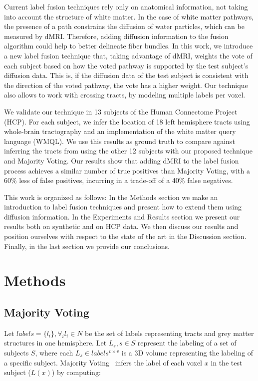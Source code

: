 Current label fusion techniques rely only on anatomical information, not taking 
into account the structure of white matter. In the case of white matter pathways,
the presence of a path constrains the diffusion of water particles, which can be
measured by dMRI. Therefore, adding diffusion information to the fusion algorithm
could help to better delineate fiber bundles. In this work, we introduce a new 
label fusion technique that, taking advantage of dMRI, weights the vote of each
subject based on how the voted pathway is supported by the test subject's diffusion
data. This is, if the diffusion data of the test subject is consistent with the
direction of the voted pathway, the vote has a higher weight. Our technique also
allows to work with crossing tracts, by modeling multiple labels per voxel.

We validate our technique in 13 subjects of the Human Connectome Project (HCP).
For each subject, we infer the location of 18 left hemisphere tracts using
whole-brain tractography and an implementation of the white matter query language
(WMQL). We use this results as ground truth to compare against inferring the
tracts from using the other 12 subjects with our proposed technique and Majority
Voting. Our results show that adding dMRI to the label fusion process achieves a
similar number of true positives than Majority Voting, with a 60\% less of
false positives, incurring in a trade-off of a 40\% false negatives.

This work is organized as follows: In the Methods section we make an introduction
to label fusion techniques and present how to extend them using diffusion
information. In the Experiments and Results section we present our results 
both on synthetic and on HCP data. We then discuss our results and position
ourselves with respect to the state of the art in the Discussion section. 
Finally, in the last section we provide our conclusions.

\section{Methods}
\label{sec:methods}

\subsection{Majority Voting}
Let $labels = \{l_i\}, \forall_i l_i \in N$ be the set of labels representing
tracts and grey matter structures in one hemisphere. Let ${L_s}, s \in S$
represent the labeling of a set of subjects $S$, where each 
$L_s \in labels^{v\times v}$ is a 3D volume representing the labeling of a
specific subject. Majority Voting~\cite{Rohlfing2004} infers the label of
each voxel $x$ in the test subject ($L(x)$) by computing:

